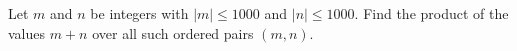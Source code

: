Let $m$ and $n$ be integers with $|m|\le1000$ and $|n|\le1000$. Find the product of the values $m+n$ over all such ordered pairs $(m,n)$.
